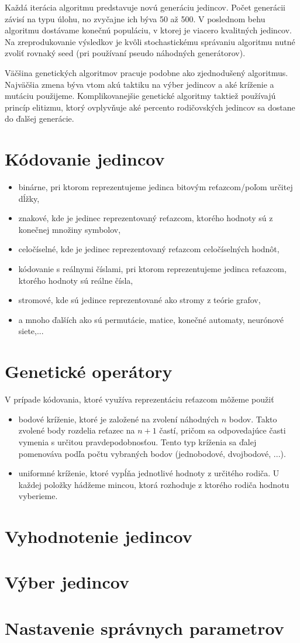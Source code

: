 Každá iterácia algoritmu predstavuje novú generáciu jedincov. Počet generácii závisí na typu úlohu, no zvyčajne ich býva 50 až 500. V poslednom behu algoritmu dostávame konečnú populáciu, v ktorej je viacero kvalitných jedincov. Na zreprodukovanie výsledkov je kvôli stochastickému správaniu algoritmu nutné zvoliť rovnaký seed (pri používaní pseudo náhodných generátorov). 

Väčšina genetických algoritmov pracuje podobne ako zjednodušený algoritmus. Najväčšia zmena býva vtom akú taktiku na výber jedincov a aké kríženie a mutáciu použijeme. Komplikovanejšie genetické algoritmy taktiež používajú princíp elitizmu, ktorý ovplyvňuje aké percento rodičovských jedincov sa dostane do ďalšej generácie.

\section{Kódovanie jedincov}\label{kap2:2.2:Coding}
\begin{itemize}
\item binárne, pri ktorom reprezentujeme jedinca bitovým reťazcom/poľom určitej dĺžky,
\item znakové, kde je jedinec reprezentovaný reťazcom, ktorého hodnoty sú z konečnej množiny symbolov,
\item celočíselné, kde je jedinec reprezentovaný reťazcom celočíselných hodnôt,
\item kódovanie s reálnymi číslami, pri ktorom reprezentujeme jedinca reťazcom, ktorého hodnoty sú reálne čísla,
\item stromové, kde sú jedince reprezentované ako stromy z teórie grafov,
\item a mnoho ďalších ako sú permutácie, matice, konečné automaty, neurónové siete,...
\end{itemize}

\section{Genetické operátory}\label{kap2:2.3:Operators}
V prípade kódovania, ktoré využíva reprezentáciu reťazcom môžeme použiť
\begin{itemize}
\item bodové kríženie, ktoré je založené na zvolení náhodných $n$ bodov. Takto zvolené body rozdelia reťazec na $n+1$ častí, pričom sa odpovedajúce časti vymenia s určitou pravdepodobnosťou. Tento typ kríženia sa ďalej pomenováva podľa počtu vybraných bodov (jednobodové, dvojbodové, ...).
\item uniformné kríženie, ktoré vypĺňa jednotlivé hodnoty z určitého rodiča. U každej položky hádžeme mincou, ktorá rozhoduje z ktorého rodiča hodnotu vyberieme.
\end{itemize}

\section{Vyhodnotenie jedincov}\label{kap2:2.4:Fitnesses}

\section{Výber jedincov}\label{kap2:2.5:Selection}

\section{Nastavenie správnych parametrov}\label{kap2:2.6:Parameters}

